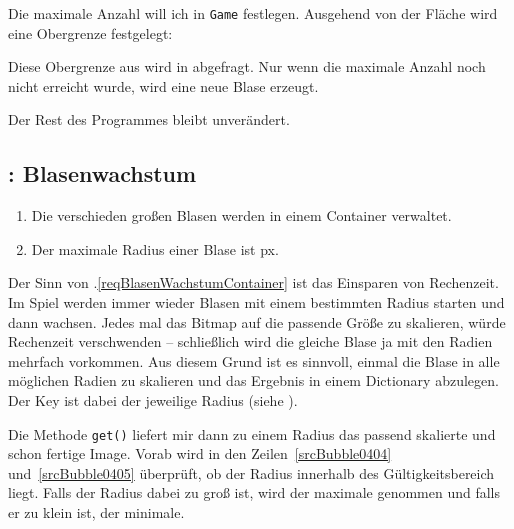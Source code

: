 Die maximale Anzahl will ich in \texttt{Game} festlegen. Ausgehend von der Fläche wird eine Obergrenze festgelegt:


Diese Obergrenze aus  wird in  abgefragt. Nur wenn die maximale Anzahl noch nicht erreicht wurde, wird eine neue Blase erzeugt.


Der Rest des Programmes bleibt unverändert.

\subsection{: Blasenwachstum}
	\begin{enumerate}
		\item Die verschieden großen Blasen werden in einem Container verwaltet.\label{reqBlasenWachstumContainer}
		
		\item Der maximale Radius einer Blase ist \unit[240]{px}.\label{reqBlasenWachstumMax}
	\end{enumerate}
\er

Der Sinn von .\ref{reqBlasenWachstumContainer} ist das Einsparen von Rechenzeit. Im Spiel werden immer wieder Blasen mit einem bestimmten Radius starten und dann wachsen. Jedes mal das Bitmap auf die passende Größe zu skalieren, würde Rechenzeit verschwenden -- schließlich wird die gleiche Blase ja mit den Radien mehrfach vorkommen. Aus diesem Grund ist es sinnvoll, einmal die Blase in alle möglichen Radien zu skalieren und das Ergebnis in einem Dictionary abzulegen. Der Key ist dabei der jeweilige Radius (siehe ).

Die Methode \texttt{get()} liefert mir dann zu einem Radius das passend skalierte und schon fertige Image. Vorab wird in den Zeilen~\ref{srcBubble0404} und~\ref{srcBubble0405} überprüft, ob der Radius innerhalb des Gültigkeitsbereich liegt. Falls der Radius dabei zu groß ist, wird der maximale genommen und falls er zu klein ist, der minimale.


